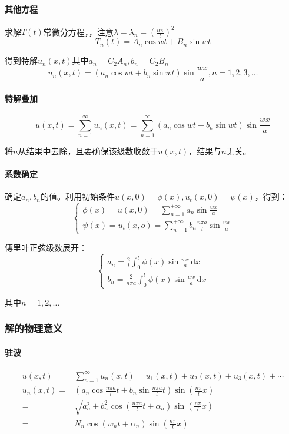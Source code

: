 \paragraph{其他方程}求解\(T(t)\)常微分方程，，注意\(\lambda=\lambda_n=\left(\frac{n\pi}{l}\right)^2\)
\[
T_n(t)=A_n\cos{w t}+B_n\sin{w t}
\]

得到特解\(u_n(x,t)\)其中\(a_n=C_2A_n,b_n=C_2B_n\)
\[
u_n(x,t)=\left(a_n\cos{w t}+b_n\sin{w t}\right)\sin\frac{wx}{a},n=1,2,3,\ldots
\]


\paragraph{特解叠加}
\[
u(x,t)=\sum_{n=1}^{\infty}{u_n(x,t)}=\sum_{n=1}^{\infty}{\left(a_n\cos w t+b_n\sin w t\right)\sin\frac{wx}{a}}
\]

将\(n\)从结果中去除，且要确保该级数收敛于\(u(x,t)\)，结果与\(n\)无关。

\paragraph{系数确定}

确定\(a_n,b_n\)的值。利用初始条件\(u(x,0)=\phi(x),u_t(x,0)=\psi(x)\)，得到：
\[\begin{cases}
\phi(x)=u(x,0)=\sum\limits_{n=1}^{+\infty}a_n\sin\frac{wx}{a}\\
\psi(x)=u_t(x,o)=\sum\limits_{n=1}^{+\infty}b_n\frac{n\pi a}{l}\sin\frac{wx}{a}
\end{cases}\]

傅里叶正弦级数展开：
\[\begin{cases}
a_n=\frac{2}{l}\int_0^l\phi(x)\sin\frac{wx}{a}\,\mathrm{d}x\\
b_n=\frac{2}{n\pi a}\int_0^l\phi(x)\sin\frac{wx}{a}\,\mathrm{d}x
\end{cases}\]

其中\(n=1,2,\ldots\)

\subsubsection{解的物理意义}

\paragraph{驻波}
\begin{align*}
u(x,t)=&\sum_{n=1}^{\infty}{u_n(x,t)}=u_1(x,t)+u_2(x,t)+u_3(x,t)+\cdots\\
u_n(x,t)=&\left(a_n\cos{\frac{n\pi a}{l}t}+b_n\sin{\frac{n\pi a}{l}t}\right)\sin{\left(\frac{n\pi}{l}x\right)}\\
=&\sqrt{a_n^2+b_n^2}\cos\left(\frac{n\pi a}{l}t+\alpha_n\right)\sin\left(\frac{n\pi}{l}x\right)\\
=&N_n\cos{( w_nt+\alpha_n)}\sin\left(\frac{n\pi}{l}x\right)
\end{align*}


